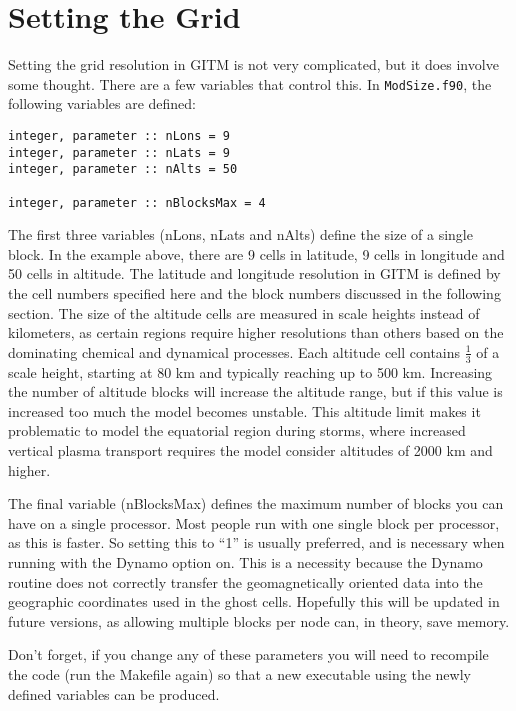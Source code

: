 \section{Setting the Grid}
\label{grid.sec}

Setting the grid resolution in GITM is not very complicated, but it
does involve some thought.  There are a few variables that control
this.  In {\tt ModSize.f90}, the following variables are defined:

\begin{verbatim}
integer, parameter :: nLons = 9
integer, parameter :: nLats = 9
integer, parameter :: nAlts = 50

integer, parameter :: nBlocksMax = 4
\end{verbatim}

The first three variables (nLons, nLats and nAlts) define the size of a single block.  In the example above, there are 9 cells in latitude, 9 cells in longitude and 50 cells in altitude.  The latitude and longitude resolution in GITM is defined by the cell numbers specified here and the block numbers discussed in the following section.  The size of the altitude cells are measured in scale heights instead of kilometers, as certain regions require higher resolutions than others based on the dominating chemical and dynamical processes.  Each altitude cell contains $\frac{1}{3}$ of a scale height, starting at 80 km and typically reaching up to 500 km.  Increasing the number of altitude blocks will increase the altitude range, but if this value is increased too much the model becomes unstable.  This altitude limit makes it problematic to model the equatorial region during storms, where increased vertical plasma transport requires the model consider altitudes of 2000 km and higher.

The final variable (nBlocksMax) defines the maximum number of blocks you can have on a single processor.  Most people run with one single block per processor, as this is faster.  So setting this to ``1'' is usually preferred, and is necessary when running with the Dynamo option on.  This is a necessity because the Dynamo routine does not correctly transfer the geomagnetically oriented data into the geographic coordinates used in the ghost cells.  Hopefully this will be updated in future versions, as allowing multiple blocks per node can, in theory, save memory.

Don't forget, if you change any of these parameters you will need to recompile the code (run the Makefile again) so that a new executable using the newly defined variables can be produced.

